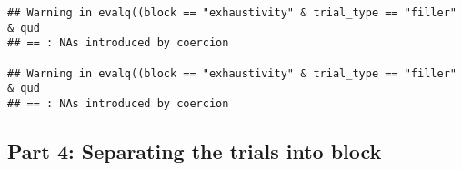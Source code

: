 \documentclass[]{article}
\newenvironment{Shaded}{\begin{snugshade}}{\end{snugshade}}
\newcommand{\KeywordTok}[1]{\textcolor[rgb]{0.13,0.29,0.53}{\textbf{#1}}}
\newcommand{\StringTok}[1]{\textcolor[rgb]{0.31,0.60,0.02}{#1}}
\newcommand{\CommentTok}[1]{\textcolor[rgb]{0.56,0.35,0.01}{\textit{#1}}}
\newcommand{\OtherTok}[1]{\textcolor[rgb]{0.56,0.35,0.01}{#1}}
\newcommand{\OperatorTok}[1]{\textcolor[rgb]{0.81,0.36,0.00}{\textbf{#1}}}
\newcommand{\NormalTok}[1]{#1}
\begin{document}
\begin{verbatim}
## Warning in evalq((block == "exhaustivity" & trial_type == "filler" & qud
## == : NAs introduced by coercion

## Warning in evalq((block == "exhaustivity" & trial_type == "filler" & qud
## == : NAs introduced by coercion
\end{verbatim}

\begin{Shaded}
\end{Shaded}

\subsection{Part 4: Separating the trials into
block}\label{part-4-separating-the-trials-into-block}
\end{document}
